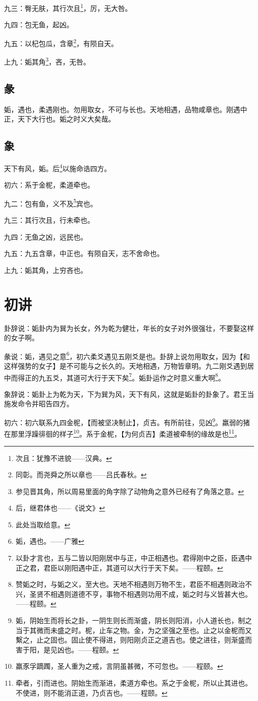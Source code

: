 \documentclass[12pt,oneside]{book}
\begin{document}
九三：臀无肤，其行次且\footnote{次且：犹豫不进貌——汉典。}，厉，无大咎。

九四：包无鱼，起凶。

九五：以杞包瓜，含章\footnote{同彰。而尧舜之所以章也——吕氏春秋。}，有陨自天。

上九：姤其角\footnote{参见晋其角，所以周易里面的角字除了动物角之意外已经有了角落之意。}，吝，无咎。


\subsection{彖}
姤，遇也，柔遇刚也。勿用取女，不可与长也。天地相遇，品物咸章也。刚遇中正，天下大行也。姤之时义大矣哉。

\subsection{象}
天下有风，姤。后\footnote{后，继君体也——《说文》}以施命诰四方。

初六：系于金柅，柔道牵也。

九二：包有鱼，义不及\footnote{此处当取给意。}宾也。

九三：其行次且，行未牵也。

九四：无鱼之凶，远民也。

九五：九五含章，中正也。有陨自天，志不舍命也。

上九：姤其角，上穷吝也。


\section{初讲}
卦辞说：姤卦内为巽为长女，外为乾为健壮，年长的女子对外很强壮，不要娶这样的女子啊。

彖说：姤，遇见之意\footnote{姤，遇也。——广雅}，初六柔爻遇见五刚爻是也。卦辞上说勿用取女，因为【和这样强势的女子】是不可能与之长久的。天地相遇，万物皆章明。九二刚爻遇到居中而得正的九五爻，其道可大行于天下矣\footnote{以卦才言也，五与二皆以阳刚居中与正，中正相遇也。君得刚中之臣，臣遇中正之君，君臣以刚阳遇中正，其道可以大行于天下矣。——程颐。}。姤卦运作之时意义重大啊\footnote{赞姤之时，与姤之义，至大也。天地不相遇则万物不生，君臣不相遇则政治不兴，圣贤不相遇则道德不亨，事物不相遇则功用不成，姤之时与义皆甚大也。——程颐。}。

象辞说：姤卦上为乾为天，下为巽为风，天下有风，这就是姤卦的卦象了。君王当施发命令并昭告四方。

初六：初六联系九四金柅，【而被坚决制止】，贞吉。有所前往，见凶\footnote{姤，阴始生而将长之卦，一阴生则长而渐盛，阴长则阳消，小人道长也，制之当于其微而未盛之时。柅，止车之物。金，为之坚强之至也。止之以金柅而又繫之，止之固也。固止使不得进，则阳刚贞正之道吉也。使之进往，则渐盛而害于阳，是见凶也。——程颐。}。羸弱的猪在那里浮躁徘徊的样子\footnote{羸豕孚蹢躅，圣人重为之戒，言阴虽甚微，不可忽也。——程颐。}。系于金柅，【为何贞吉】柔道被牵制的缘故是也\footnote{牵者，引而进也。阴始生而渐进，柔道方牵也。系之于金柅，所以止其进也。不使进，则不能消正道，乃贞吉也。——程颐。}。
\end{document}
